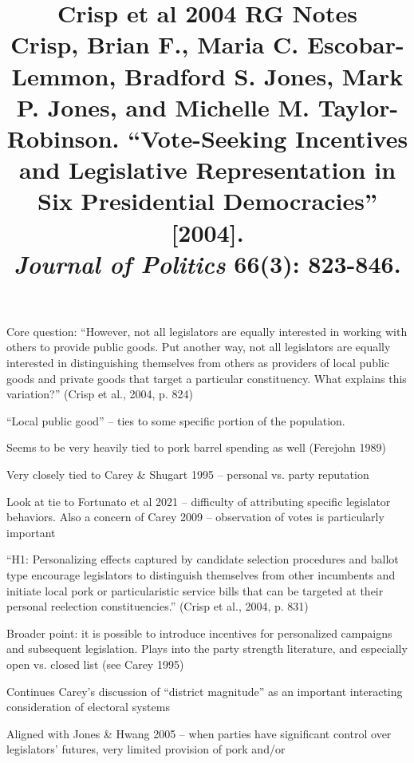 \documentclass[12pt]{article}
\title{\textbf{Crisp et al 2004 RG Notes}\\
\large Crisp, Brian F., Maria C. Escobar-Lemmon, Bradford S. Jones, Mark P. Jones, and Michelle M. Taylor-Robinson. ``Vote-Seeking Incentives and Legislative Representation in Six Presidential Democracies'' [2004].\\
\textit{Journal of Politics} 66(3): 823-846.}
\author{}
\date{}
\begin{document}
\maketitle

Core question: ``However, not all legislators are equally interested in working with others to provide public goods. Put another way, not all legislators are equally interested in distinguishing themselves from others as providers of local public goods and private goods that target a particular constituency. What explains this variation?'' (Crisp et al., 2004, p. 824)

``Local public good'' -- ties to some specific portion of the population.

Seems to be very heavily tied to pork barrel spending as well (Ferejohn 1989)

Very closely tied to Carey \& Shugart 1995 -- personal vs. party reputation

Look at tie to Fortunato et al 2021 -- difficulty of attributing specific legislator behaviors. Also a concern of Carey 2009 -- observation of votes is particularly important

``H1: Personalizing effects captured by candidate selection procedures and ballot type encourage legislators to distinguish themselves from other incumbents and initiate local pork or particularistic service bills that can be targeted at their personal reelection constituencies.'' (Crisp et al., 2004, p. 831)

Broader point: it is possible to introduce incentives for personalized campaigns and subsequent legislation. Plays into the party strength literature, and especially open vs. closed list (see Carey 1995)

Continues Carey's discussion of ``district magnitude'' as an important interacting consideration of electoral systems

Aligned with Jones \& Hwang 2005 -- when parties have significant control over legislators' futures, very limited provision of pork and/or
\end{document}

